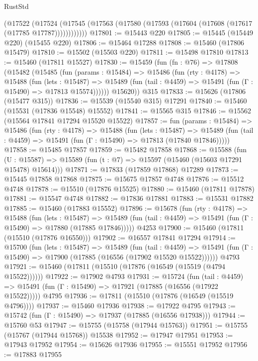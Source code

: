 \begin{lexlean}{RustStd}
\begin{coremodule}
        (@17522
          (@17524 (@17545 (@17563 (@17580 (@17593 (@17604 (@17608 (@17617 (@17785 @17787))))))))))))
@17801 := @15443 @220
@17805 := @15445 (@15449 @220) (@15455 @220)
@17806 := @15464 @17288
@17808 := @15460 (@17806 @15479)
@17810 := @15502 (@15503 @220)
@17811 := @15498 @17810
@17813 := @15460 (@17811 @15527)
@17830 := @15459
    (fun (fn : @76) =>
    @17808
      (@15482
        (@15485
          (fun (params : @15484) =>
          @15486
            (fun (rty : @4178) =>
            @15488
              (fun (lets : @15487) =>
              @15489 (fun (tail : @4459) => @15491 (fun (Γ : @15490) => @17813 @15574))))))
        @15620))
    @315
@17833 := @15626 (@17806 (@15477 @315))
@17836 := @15539 (@15540 @315) @17291
@17840 := @15460 (@15531 (@17836 @15548) @15552)
@17841 := @15565 @315
@17846 := @15562 (@15564 @17841 @17294 @15520 @15522)
@17857 := fun (params : @15484) =>
  @15486
    (fun (rty : @4178) =>
    @15488
      (fun (lets : @15487) =>
      @15489 (fun (tail : @4459) => @15491 (fun (Γ : @15490) => @17813 (@17840 @17846)))))
@17858 := @15485 @17857
@17859 := @15482 @17858
@17868 := @15588
    (fun (U : @15587) => @15589 (fun (t : @7) => @15597 (@15460 (@15603 @17291 @15478) @15614)))
@17871 := @17833 (@17859 @17868) @17289
@17873 := @15445 @17858 @17868
@17875 := @15675 @17857 @4748
@17876 := @15512 @4748
@17878 := @15510 (@17876 @15525)
@17880 := @15460 (@17811 @17878)
@17881 := @15547 @4748
@17882 := @17836 @17881
@17883 := @15531 @17882
@17885 := @15460 (@17883 @15552)
@17896 := @15678
    (fun (rty : @4178) =>
    @15488
      (fun (lets : @15487) =>
      @15489 (fun (tail : @4459) => @15491 (fun (Γ : @15490) => @17880 (@17885 @17846)))))
    @4253
@17900 := @15460 (@17811 (@15510 (@17876 @16550)))
@17902 := @16557 @17841 @17294
@17914 := @15700
    (fun (lets : @15487) =>
    @15489
      (fun (tail : @4459) =>
      @15491 (fun (Γ : @15490) => @17900 (@17885 (@16556 (@17902 @15520 @15522))))))
    @4793
@17921 := @15460 (@17811 (@15510 (@17876 (@16549 (@15519 (@4794 @15522))))))
@17922 := @17902 @4793
@17931 := @15724
    (fun (tail : @4459) => @15491 (fun (Γ : @15490) => @17921 (@17885 (@16556 (@17922 @15522)))))
    @4795
@17936 := @17811 (@15510 (@17876 (@16549 (@15519 @4796))))
@17937 := @15460 @17936
@17938 := @17922 @4795
@17943 := @15742 (fun (Γ : @15490) => @17937 (@17885 (@16556 @17938)))
@17944 := @15760 @53
@17947 := @15755 (@15758 (@17944 @15763))
@17951 := @15755 (@15767 (@17944 @15768)) @15538
@17952 := @17947 @17951
@17953 := @17943 @17952
@17954 := @15626 @17936
@17955 := @15551 @17952
@17956 := @17883 @17955

\end{coremodule}
\end{lexlean}
